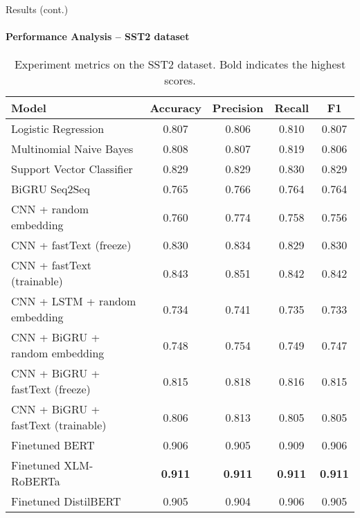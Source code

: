 \begin{frame}{Results (cont.)}
\framesubtitle{Performance Analysis -- SST2 dataset}
\begin{table}
\small{
\begin{tabular*}{\textwidth}{@{\extracolsep\fill}lcccc}
\hline
\textbf{Model}                & \textbf{Accuracy} & \textbf{Precision} & \textbf{Recall} &  \textbf{F1} \\ \hline
Logistic Regression   & 0.807 & 0.806 & 0.810 & 0.807 \\ 
Multinomial Naive Bayes   & 0.808 & 0.807 & 0.819 & 0.806 \\ 
Support Vector Classifier & 0.829 & 0.829 & 0.830 & 0.829  \\ \hline
BiGRU Seq2Seq  & 0.765 & 0.766 & 0.764 & 0.764 \\ \hline
CNN + random embedding  & 0.760 & 0.774 & 0.758 & 0.756   \\
CNN + fastText (freeze)   & 0.830 & 0.834 & 0.829 & 0.830 \\
CNN + fastText (trainable) & 0.843 & 0.851 & 0.842 & 0.842 \\ \hline

CNN + LSTM + random embedding  & 0.734 & 0.741 & 0.735 & 0.733  \\
CNN + BiGRU + random embedding     & 0.748 & 0.754 & 0.749 & 0.747   \\
CNN + BiGRU + fastText (freeze)   & 0.815 & 0.818 & 0.816 & 0.815  \\
CNN + BiGRU + fastText (trainable) & 0.806 & 0.813 & 0.805 & 0.805 \\ \hline 
Finetuned BERT & 0.906 & 0.905 & 0.909 & 0.906  \\
Finetuned XLM-RoBERTa & \textbf{0.911} & \textbf{0.911} & \textbf{0.911} & \textbf{0.911}  \\ \hline
Finetuned DistilBERT  & 0.905 & 0.904 & 0.906 & 0.905  \\ \hline
\end{tabular*}
}
\caption{Experiment metrics on the SST2 dataset. Bold indicates the highest scores.} \label{tab:result-SST2}
\end{table}
\end{frame}

